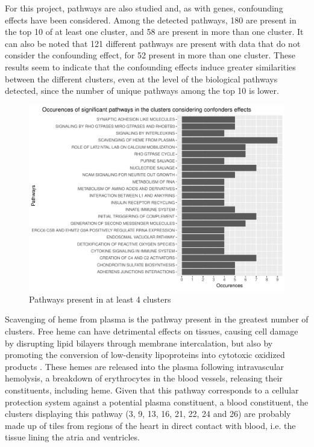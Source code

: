 \documentclass[a4paper, 11pt]{article}
\begin{document}
\begin{multicols}{2}
For this project, pathways are also studied and, as with genes, confounding effects have been considered. Among the detected pathways, 180 are present in the top 10 of at least one cluster, and 58 are present in more than one cluster. It can also be noted that 121 different pathways are present with data that do not consider the confounding effect, for 52 present in more than one cluster. These results seem to indicate that the confounding effects induce greater similarities between the different clusters, even at the level of the biological pathways detected, since the number of unique pathways among the top 10 is lower.


\begin{figure}[H]
	\centering
	\includegraphics[width=\columnwidth]{figures/final_analysis/PathwaysWithConf}
	\caption{Pathways present in at least 4 clusters}
	\label{fig:path}
\end{figure}

Scavenging of heme from plasma is the pathway present in the greatest number of clusters. Free heme can have detrimental effects on tissues, causing cell damage by disrupting lipid bilayers through membrane intercalation, but also by promoting the conversion of low-density lipoproteins into cytotoxic oxidized products  \citep{reactomeReactomeScavenging}. These hemes are released into the plasma following intravascular hemolysis, a breakdown of erythrocytes in the blood vessels, releasing their constituents, including heme. Given that this pathway corresponds to a cellular protection system against a potential plasma constituent, a blood constituent, the clusters displaying this pathway (3, 9, 13, 16, 21, 22, 24 and 26) are probably made up of tiles from regions of the heart in direct contact with blood, i.e. the tissue lining the atria and ventricles. 


\end{multicols}
\end{document}
